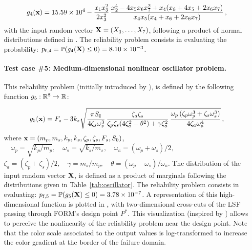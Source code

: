 \begin{equation}
    g_4({\bf x}) = 15.59 \times 10^4 - \frac{x_1 x_3^2}{2 x_3^2} \, \frac{x_2^4 - 4 x_5 x_6 x_7^2 + x_4 (x_6 + 4 x_5 + 2 x_6 x_7)}{x_4 x_5 (x_4 + x_6 + 2 x_6 x_7)}\, ,
\end{equation}
with the input random vector ${\bf X} = (X_1, \dots, X_7)$, following a product of normal distributions defined in \cite{yun2018efficient}. 
The reliability problem consists in evaluating the probability: $p_{\mathrm{f}, 4} = \mathbb{P} ( g_4({\bf X}) \leq 0 ) =  8.10 \times 10^{-3}$.


\paragraph{Test case \#5: Medium-dimensional nonlinear oscillator problem.}
This reliability problem (initially introduced by \citealp{destefano_1990}), is defined by the following function $g_5 : \mathbb{R}^8 \rightarrow \mathbb{R}$:

\begin{equation}
    g_5({\bf x}) = F_s - 3 k_s \sqrt{\frac{\pi S_0}{4 \zeta_s \omega_s^3} \, \frac{\zeta_a \zeta_s}{\zeta_p \zeta_s (4 \zeta_a^2 + \theta^2) + \gamma \zeta_a^2} \, \frac{\omega_p \, (\zeta_p \omega_p^3 + \zeta_s \omega_s^3)}{4 \zeta_a \omega_a^4}} \, ,
\end{equation}
where ${\bf x} = \left(m_p, m_s, k_p, k_s, \zeta_p, \zeta_s, F_s, S_0\right)$,  
$\quad \omega_p=\sqrt{k_p/m_p}, \quad \omega_s=\sqrt{k_s/m_s}, \quad \omega_a = (\omega_p + \omega_s)/2, \quad $
$\zeta_a = (\zeta_p + \zeta_s)/2, \quad \gamma = m_s/m_p, \quad \theta= (\omega_p-\omega_s)/\omega_a$. 
The distribution of the input random vector ${\bf X}$, is defined as a product of marginals following the distributions given in Table~\ref{tab:oscillator}. 
The reliability problem consists in evaluating: $p_{\mathrm{f}, 5} = \mathbb{P} ( g_5({\bf X}) \leq 0 ) =  3.78 \times 10^{-7}$.
A representation of this high-dimensional function is plotted in , with two-dimensional cross-cuts of the LSF passing through FORM's design point $P^*$. 
This visualization (inspired by \citealp{dubourg_2011,bourinet_2018,chabridon_2018_thesis}) allows to perceive the nonlinearity of the reliability problem near the design point. 
Note that the color scale associated to the output values is log-transformed to increase the color gradient at the border of the failure domain. 

